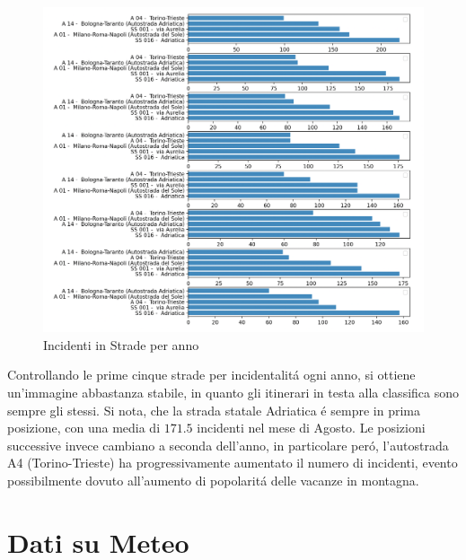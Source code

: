 \documentclass[a4paper]{report}
\begin{document}
\begin{figure}[!ht]
    \includegraphics[width=\linewidth]{../src/incidenti/incidenti_aci/agosto/autostrade.png}
    \caption{Incidenti in Strade per anno}
    \label{fig:autostrade_anno}
\end{figure}

Controllando le prime cinque strade per incidentalit\'a ogni anno, si ottiene un'immagine 
abbastanza stabile, in quanto gli itinerari in testa alla classifica sono sempre gli stessi.
Si nota, che la strada statale Adriatica \'e sempre in prima posizione, 
con una media di $171.5$ incidenti nel mese di Agosto.
Le posizioni successive invece cambiano a seconda dell'anno, in particolare per\'o, l'autostrada 
A4 (Torino-Trieste) ha progressivamente aumentato il numero di incidenti, evento possibilmente 
dovuto all'aumento di popolarit\'a delle vacanze in montagna.


\clearpage
\chapter{Dati su Meteo}



\end{document}
